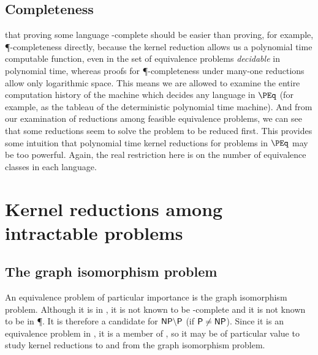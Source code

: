 \documentclass{amsart}
\theoremstyle{definition} \newtheorem{definition}[definition]{Definition}
\begin{document}

\subsection{Completeness}
that proving some language \PEq-complete should be easier than proving, for
example, \P-completeness directly, because the kernel reduction allows us a
polynomial time computable function, even in the set of equivalence problems
\emph{decidable} in polynomial time, whereas proofs for \P-completeness under
many-one reductions allow only logarithmic space. This means we are allowed to
examine the entire computation history of the machine which decides any
language in $\PEq$ (for example, as the tableau of the deterministic polynomial
time machine). And from our examination of reductions among feasible
equivalence problems, we can see that some reductions seem to solve the problem
to be reduced first. This provides some intuition that polynomial time kernel
reductions for problems in $\PEq$ may be too powerful. Again, the real
restriction here is on the number of equivalence classes in each language.



\section{Kernel reductions among intractable problems}

\subsection{The graph isomorphism problem}

An equivalence problem of particular importance is the graph isomorphism
problem. Although it is in \NP, it is not known to be \NP-complete and it is
not known to be in \P. It is therefore a candidate for ${\mathsf{NP}}\backslash{\ensuremath{\mathsf{P}}}$ (if
${\mathsf{P}}\neq{\ensuremath{\mathsf{NP}}}$). Since it is an equivalence problem in \NP, it is a member of
\NPEq, so it may be of particular value to study kernel reductions to and from
the graph isomorphism problem. 
\end{document}
